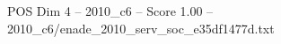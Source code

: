 \begin{textsample}{POS Dim 4 – 2010\_c6 – Score 1.00 – 2010\_c6/enade\_2010\_serv\_soc\_e35df1477d.txt}
\end{textsample}
